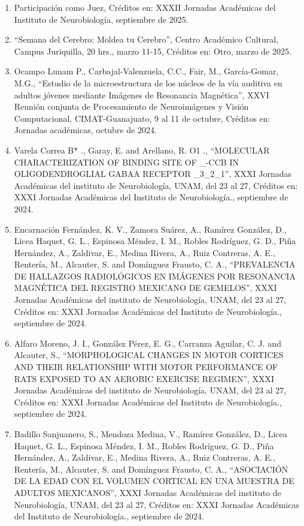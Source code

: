 \begin{enumerate}
\item  Participación como Juez, Créditos en: XXXII Jornadas Académicas del Instituto de Neurobiología, septiembre de 2025.

\item  “Semana del Cerebro: Moldea tu Cerebro”, Centro Académico Cultural, Campus Juriquilla, 20 hrs., marzo 11-15, Créditos 
en: 
Otro, marzo de 2025.

\item  Ocampo Lunam P., Carbajal-Valenzuela, C.C., Fair, M., García-Gomar, M.G., “Estudio de la microestructura de los 
núcleos de 
la vía auditiva en adultos jóvenes mediante Imágenes de Resonancia Magnética”, XXVI Reunión conjunta de Procesamiento de 
Neuroimágenes y Visión Computacional, CIMAT-Guanajuato, 9 al 11 de octubre, Créditos en: Jornadas académicas, octubre de 
2024.

\item  Varela Correa B* ., Garay, E. and Arellano, R. O1 ., “MOLECULAR CHARACTERIZATION OF BINDING SITE OF _-CCB IN 
OLIGODENDROGLIAL GABAA RECEPTOR _3_2_1”, XXXI Jornadas Académicas del instituto de Neurobiología, UNAM, del 23 al 27, 
Créditos en: XXXI Jornadas Académicas del Instituto de Neurobiología., septiembre de 2024.

\item  Encarnación Fernández, K. V., Zamora Suárez, A., Ramírez González, D., Licea Haquet, G. L., Espinosa Méndez, I. M., 
Robles Rodríguez, G. D., Piña Hernández, A., Zaldivar, E., Medina Rivera, A., Ruiz Contreras, A. E., Rentería, M., Alcauter, 
S. and Domínguez Frausto, C. A., “PREVALENCIA DE HALLAZGOS RADIOLÓGICOS EN IMÁGENES POR RESONANCIA MAGNÉTICA DEL REGISTRO 
MEXICANO DE GEMELOS”, XXXI Jornadas Académicas del instituto de Neurobiología, UNAM, del 23 al 27, Créditos en: XXXI Jornadas 
Académicas del Instituto de Neurobiología., septiembre de 2024.

\item  Alfaro Moreno, J. I., González Pérez, E. G., Carranza Aguilar, C. J. and Alcauter, S., “MORPHOLOGICAL CHANGES IN MOTOR 
CORTICES AND THEIR RELATIONSHIP WITH MOTOR PERFORMANCE OF RATS EXPOSED TO AN AEROBIC EXERCISE REGIMEN”, XXXI Jornadas 
Académicas del instituto de Neurobiología, UNAM, del 23 al 27, Créditos en: XXXI Jornadas Académicas del Instituto de 
Neurobiología., septiembre de 2024.

\item  Badillo Sanjuanero, S., Mendoza Medina, V., Ramírez González, D., Licea Haquet, G. L., Espinosa Méndez, I. M., Robles 
Rodríguez, G. D., Piña Hernández, A., Zaldivar, E., Medina Rivera, A., Ruiz Contreras, A. E., Rentería, M., Alcauter, S. and 
Domínguez Frausto, C. A., “ASOCIACIÓN DE LA EDAD CON EL VOLUMEN CORTICAL EN UNA MUESTRA DE ADULTOS MEXICANOS”, XXXI Jornadas 
Académicas del instituto de Neurobiología, UNAM, del 23 al 27, Créditos en: XXXI Jornadas Académicas del Instituto de 
Neurobiología., septiembre de 2024.


\end{enumerate}

